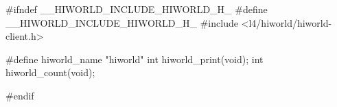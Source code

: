 #ifndef __HIWORLD_INCLUDE_HIWORLD_H_
#define __HIWORLD_INCLUDE_HIWORLD_H_
#include <l4/hiworld/hiworld-client.h>

#define hiworld_name "hiworld"
int hiworld_print(void);
int hiworld_count(void);

#endif
